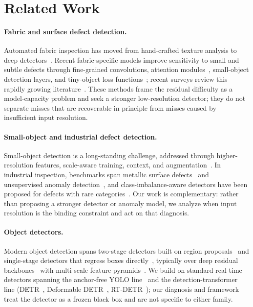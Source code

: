 \section{Related Work}
\label{sec:related}

\paragraph{Fabric and surface defect detection.}
Automated fabric inspection has moved from hand-crafted texture analysis to deep
detectors~\cite{fabricsurvey}. Recent fabric-specific models improve sensitivity
to small and subtle defects through fine-grained convolutions, attention
modules~\cite{cbam}, small-object detection layers, and tiny-object loss
functions~\cite{fabricyolo,liang2025denim}; recent surveys review this rapidly
growing literature~\cite{eaaisurvey}. These methods frame the residual
difficulty as a model-capacity problem and seek a stronger low-resolution
detector; they do not separate misses that are recoverable in principle from
 misses caused by insufficient input resolution.

\paragraph{Small-object and industrial defect detection.}
Small-object detection is a long-standing challenge, addressed through
higher-resolution features, scale-aware training, context, and
augmentation~\cite{sodsurvey,focalloss}. In industrial inspection, benchmarks
span metallic surface defects~\cite{neudet} and unsupervised anomaly
detection~\cite{mvtecad}, and class-imbalance-aware detectors have been
proposed for defects with rare categories~\cite{eaaiimbalance}. Our work is complementary: rather than proposing a
stronger detector or anomaly model, we analyze when input resolution is the
binding constraint and act on that diagnosis.

\paragraph{Object detectors.}
Modern object detection spans two-stage detectors built on region
proposals~\cite{fasterrcnn} and single-stage detectors that regress boxes
directly~\cite{yolov1,ssd}, typically over deep residual
backbones~\cite{resnet} with multi-scale feature
pyramids~\cite{fpn}. We build on standard real-time detectors spanning the
anchor-free YOLO line~\cite{yolov1,yolov8,yolo11} and the
detection-transformer line (DETR~\cite{detr}, Deformable DETR~\cite{deformabledetr}, RT-DETR~\cite{rtdetr}); our
diagnosis and framework treat the detector as a frozen black box and are not
specific to either family.

